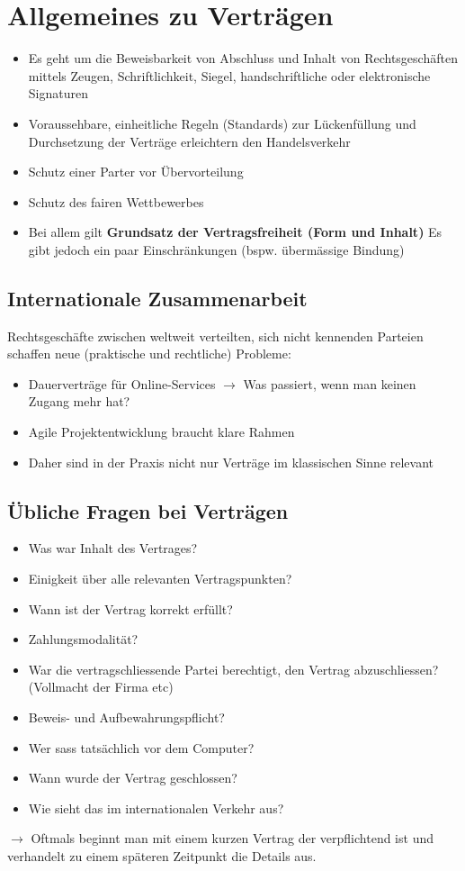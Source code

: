 \documentclass{report}
\theoremstyle{definition}
\theoremstyle{example}
\begin{document}
\section{Allgemeines zu Verträgen}
\begin{itemize}
   \item Es geht um die Beweisbarkeit von Abschluss und Inhalt von Rechtsgeschäften mittels Zeugen, Schriftlichkeit, Siegel, handschriftliche oder elektronische Signaturen
   \item Voraussehbare, einheitliche Regeln (Standards) zur Lückenfüllung und Durchsetzung der Verträge erleichtern den Handelsverkehr
   \item Schutz einer Parter vor Übervorteilung
   \item Schutz des fairen Wettbewerbes
   \item Bei allem gilt \textbf{Grundsatz der Vertragsfreiheit (Form und Inhalt)}
   \subitem Es gibt jedoch ein paar Einschränkungen (bspw. übermässige Bindung) 
\end{itemize}

\subsection{Internationale Zusammenarbeit}
Rechtsgeschäfte zwischen weltweit verteilten, sich nicht kennenden Parteien schaffen neue (praktische und rechtliche) Probleme:
\begin{itemize}
   \item Dauerverträge für Online-Services $\rightarrow$ Was passiert, wenn man keinen Zugang mehr hat?
   \item Agile Projektentwicklung braucht klare Rahmen
   \item Daher sind in der Praxis nicht nur Verträge im klassischen Sinne relevant
\end{itemize}

\subsection{Übliche Fragen bei Verträgen}
\begin{itemize}
   \item Was war Inhalt des Vertrages?
   \item Einigkeit über alle relevanten Vertragspunkten?
   \item Wann ist der Vertrag korrekt erfüllt?
   \item Zahlungsmodalität?
   \item War die vertragschliessende Partei berechtigt, den Vertrag abzuschliessen? (Vollmacht der Firma etc)
   \item Beweis- und Aufbewahrungspflicht?
   \item Wer sass tatsächlich vor dem Computer?
   \item Wann wurde der Vertrag geschlossen?
   \item Wie sieht das im internationalen Verkehr aus?
\end{itemize}
$\rightarrow$ Oftmals beginnt man mit einem kurzen Vertrag der verpflichtend ist und verhandelt zu einem späteren Zeitpunkt die Details aus. 
\end{document}
